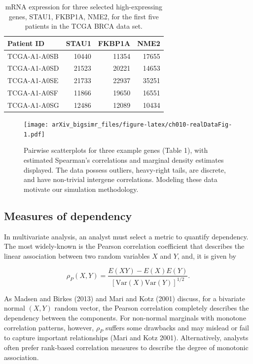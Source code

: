 \documentclass{article}
\begin{document}
\begin{table}

\caption{\label{tab:ch010-realDataTab}mRNA expression for three selected high-expressing genes, STAU1, FKBP1A, NME2, for the first five patients in the TCGA BRCA data set.}
\centering
\begin{tabular}[t]{lrrr}
\toprule
Patient ID & STAU1 & FKBP1A & NME2\\
\midrule
TCGA-A1-A0SB & 10440 & 11354 & 17655\\
TCGA-A1-A0SD & 21523 & 20221 & 14653\\
TCGA-A1-A0SE & 21733 & 22937 & 35251\\
TCGA-A1-A0SF & 11866 & 19650 & 16551\\
TCGA-A1-A0SG & 12486 & 12089 & 10434\\
\bottomrule
\end{tabular}
\end{table}

\begin{figure}
\centering
\texttt{[image: arXiv\_bigsimr\_files/figure-latex/ch010-realDataFig-1.pdf]}
\caption{\label{fig:ch010-realDataFig}Pairwise scatterplots for three
example genes (Table 1), with estimated Spearman's correlations and
marginal density estimates displayed. The data possess outliers,
heavy-right tails, are discrete, and have non-trivial intergene
correlations. Modeling these data motivate our simulation methodology.}
\end{figure}

\hypertarget{measures-of-dependency}{%
\subsection{Measures of dependency}\label{measures-of-dependency}}

In multivariate analysis, an analyst must select a metric to quantify
dependency. The most widely-known is the Pearson correlation coefficient
that describes the linear association between two random variables \(X\)
and \(Y\), and, it is given by

\begin{equation}
\rho_P(X,Y) = \frac{E(XY) - E(X)E(Y)}{\left[ \mathrm{Var}(X)\mathrm{Var}(Y)\right]^{1/2}}.
\label{eq:pearson}
\end{equation}

As Madsen and Birkes (2013) and Mari and Kotz (2001) discuss, for a
bivariate normal \((X,Y)\) random vector, the Pearson correlation
completely describes the dependency between the components. For
non-normal marginals with monotone correlation patterns, however,
\(\rho_P\) suffers some drawbacks and may mislead or fail to capture
important relationships (Mari and Kotz 2001). Alternatively, analysts
often prefer rank-based correlation measures to describe the degree of
monotonic association.
\end{document}
